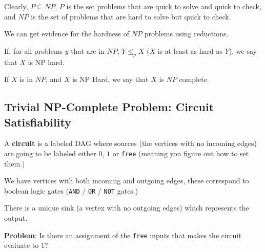 \documentclass[12pt]{article}
\begin{document}
  Clearly, $P \subseteq NP$, $P$ is the set problems that are quick to solve and
  quick to check, and $NP$ is the set of problems that are hard to solve but
  quick to check.

  We can get evidence for the hardness of $NP$ problems using reductions.

  {
    If, for all problems $y$ that are in $NP$, $Y \le_p X$ ($X$ is at least as
    hard as $Y$), we say that $X$ is NP hard.
  }

  {
    If $X$ is in $NP$, and $X$ is NP Hard, we say that $X$ is $NP$ complete.
  }

  \subsection{Trivial NP-Complete Problem: Circuit Satisfiability}

  A {\bf circuit} is a labeled DAG where sources (the vertices with no incoming
  edges) are going to be labeled either $0$, $1$ or \texttt{free} (meaning you
  figure out how to set them.)

  We have vertices with both incoming and outgoing edges, these correspond to
  boolean logic gates (\texttt{AND} / \texttt{OR} / \texttt{NOT} gates.)

  There is a unique sink (a vertex with no outgoing edges) which represents the
  output.

  {\bf Problem}: Is there an assignment of the \texttt{free} inputs that makes
  the circuit evaluate to $1$?
\end{document}
